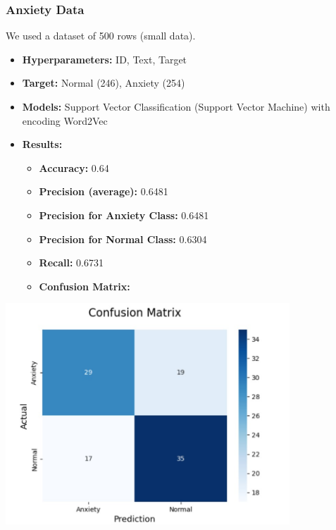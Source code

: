 \documentclass[a4paper,12pt]{article}
\begin{document}
\subsubsection{Anxiety Data}
We used a dataset of 500 rows (small data).
\begin{itemize}
    \item \textbf{Hyperparameters:} ID, Text, Target
    \item \textbf{Target:} Normal (246), Anxiety (254)
    \item \textbf{Models:} Support Vector Classification (Support Vector Machine) with encoding Word2Vec
    \item \textbf{Results:}
    \begin{itemize}
        \item \textbf{Accuracy:} 0.64
        \item \textbf{Precision (average):} 0.6481
        \item \textbf{Precision for Anxiety Class:} 0.6481
        \item \textbf{Precision for Normal Class:} 0.6304
        \item \textbf{Recall:} 0.6731
        \item \textbf{Confusion Matrix:}
    \end{itemize}
\end{itemize}

\begin{center}
    \includegraphics[width=0.8\textwidth]{Anxiety-Data-SmallData.jpg} %
\end{center}

\vspace{0.5cm} %
\end{document}
